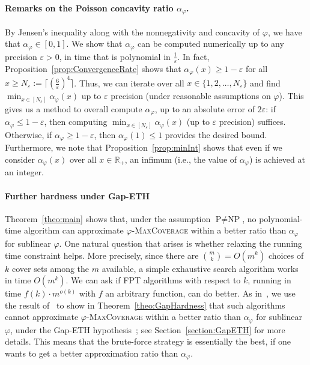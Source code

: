 \paragraph{Remarks on the {Poisson concavity ratio} $\alpha_{\varphi}$.}
\label{para:rkpoi}
By Jensen's inequality along with the nonnegativity and concavity of $\varphi$, we have that $\alpha_{\varphi} \in [0,1]$.  We show that $\alpha_{\varphi}$ can be computed numerically up to any precision $\varepsilon > 0$, in time that is polynomial in $\frac{1}{\varepsilon}$. In fact, Proposition~\ref{prop:ConvergenceRate} shows that $\alpha_{\varphi}(x) \geq 1 - \varepsilon$ for all $x \geq N_{\varepsilon} := \lceil \left(\frac{6}{\varepsilon}\right)^4 \rceil$. Thus, we can iterate over all $x \in \{1, 2, \ldots, N_\varepsilon \}$ and find $\min_{x \in [N_{\varepsilon}]} \alpha_{\varphi}(x)$ up to $\varepsilon$ precision (under reasonable assumptions on $\varphi$). This gives us a method to overall compute $\alpha_{\varphi}$, up to an absolute error of $2 \varepsilon$: if $\alpha_{\varphi} \leq 1 - \varepsilon$, then computing $\min_{x \in [N_{\varepsilon}]} \alpha_{\varphi}(x)$ (up to $\varepsilon$ precision) suffices. Otherwise, if $\alpha_{\varphi} \geq 1 - \varepsilon$, then $\alpha_\varphi(1) \leq 1$ provides the desired bound. 
Furthermore, we note that Proposition~\ref{prop:minInt} shows that even if we consider $\alpha_{\varphi}(x)$ over all $x \in \mathbb{R}_+$, an infimum (i.e., the value of $\alpha_{\varphi}$) is achieved at an integer.

\paragraph{Further hardness under Gap-ETH}
Theorem~\ref{theo:main} shows that, under the assumption $\textrm{P} \not= \textrm{NP}$, no polynomial-time algorithm can approximate $\varphi$-\textsc{MaxCoverage} within a better ratio than $\alpha_{\varphi}$ for sublinear $\varphi$. One natural question that arises is whether relaxing the running time constraint helps. More precisely, since there are $\binom{m}{k} = O(m^k)$ choices of $k$ cover sets among the $m$ available, a simple exhaustive search algorithm works in time $O(m^k)$. We can ask if FPT algorithms with respect to $k$, running in time $f(k) \cdot m^{o(k)}$ with $f$ an arbitrary function, can do better. As in~\cite{DMMS20}, we use the result of~\cite{Manurangsi20} to show in Theorem~\ref{theo:GapHardness} that such algorithms cannot approximate $\varphi$-\textsc{MaxCoverage} within a better ratio than $\alpha_{\varphi}$ for sublinear $\varphi$, under the Gap-ETH hypothesis~\cite{CCKLMNT17}; see Section~\ref{section:GapETH} for more details. This means that the brute-force strategy is essentially the best, if one wants to get a better approximation ratio than $\alpha_{\varphi}$.

